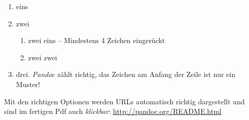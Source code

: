 \begin{enumerate}
\def\labelenumi{\arabic{enumi}.}
\item
  eins
\item
  zwei

  \begin{enumerate}
  \def\labelenumii{\roman{enumii}.}
  \tightlist
  \item
    zwei eins -- Mindestens 4 Zeichen eingerückt
  \item
    zwei zwei
  \end{enumerate}
\item
  drei. \emph{Pandoc} zählt richtig, das Zeichen am Anfang der Zeile ist
  nur ein Muster!
\end{enumerate}

Mit den richtigen Optionen werden URLs automatisch richtig dargestellt
und sind im fertigen Pdf auch \emph{klickbar}:
\url{http://pandoc.org/README.html}
